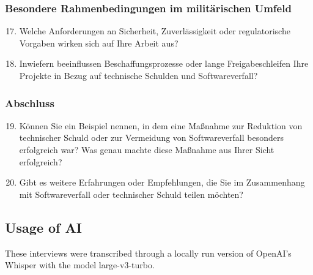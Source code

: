 \subsubsection*{Besondere Rahmenbedingungen im militärischen Umfeld}
\begin{enumerate}
    \setcounter{enumi}{16}
    \item Welche Anforderungen an Sicherheit, Zuverlässigkeit oder regulatorische Vorgaben wirken sich auf Ihre Arbeit aus?
    \item Inwiefern beeinflussen Beschaffungsprozesse oder lange Freigabeschleifen Ihre Projekte in Bezug auf technische Schulden und Softwareverfall?
\end{enumerate}

\subsubsection*{Abschluss}
\begin{enumerate}
    \setcounter{enumi}{18}
    \item Können Sie ein Beispiel nennen, in dem eine Maßnahme zur Reduktion von technischer Schuld oder zur Vermeidung von Softwareverfall besonders erfolgreich war? Was genau machte diese Maßnahme aus Ihrer Sicht erfolgreich?
    \item Gibt es weitere Erfahrungen oder Empfehlungen, die Sie im Zusammenhang mit Softwareverfall oder technischer Schuld teilen möchten?
\end{enumerate}



\subsection*{Usage of AI}

These interviews were transcribed through a locally run version of OpenAI's Whisper with the model large-v3-turbo.
